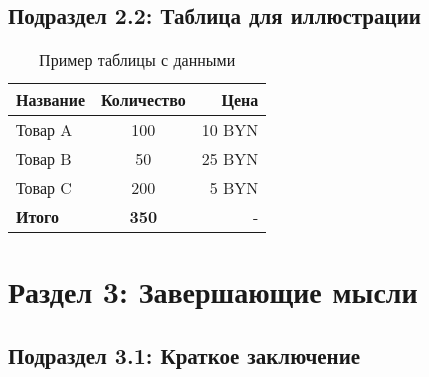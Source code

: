 \lipsum[41-43] %

\subsection{Подраздел 2.2: Таблица для иллюстрации}

\begin{table}[ht]
    \centering
    \begin{tabular}{|l|c|r|}
        \hline
        Название & Количество & Цена \\
        \hline
        Товар A & 100 & 10 BYN \\
        Товар B & 50  & 25 BYN \\
        Товар C & 200 & 5 BYN  \\
        \hline
        \textbf{Итого} & \textbf{350} & - \\
        \hline
    \end{tabular}
    \caption{Пример таблицы с данными}
    \label{tab:example_table}
\end{table}

\lipsum[44-45] %

\section{Раздел 3: Завершающие мысли}

\lipsum[46-50] %

\subsection{Подраздел 3.1: Краткое заключение}

\lipsum[51-55] %

